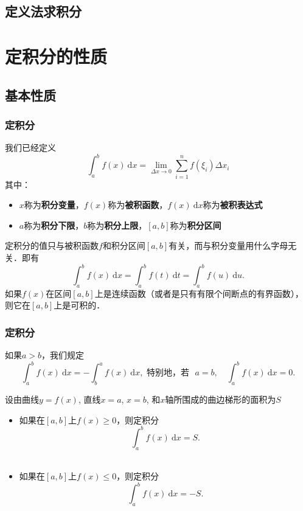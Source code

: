 \documentclass[
10pt,
aspectratio=43,
]{beamer}
\begin{document}
\subsection{定义法求积分}
\section{定积分的性质}
\subsection{基本性质}

\begin{frame}
	\frametitle{定积分}
	我们已经定义
	\[
		\int_a^b f(x)\mathrm{~d}x  = \lim_{\Delta x\to 0} \sum_{i=1}^n f(\xi_i)\Delta x_i
	\]
	其中：
	\begin{itemize}
		\item $x$称为{\bf 积分变量}，$f(x)$称为{\bf 被积函数}，$f(x)\mathrm{~d}x$称为{\bf 被积表达式}
		\item $a$称为{\bf 积分下限}，$b$称为{\bf 积分上限}，$[a,b]$称为{\bf 积分区间}
	\end{itemize}
	\begin{block}{}
		定积分的值只与被积函数$f$和积分区间$[a,b]$有关，而与积分变量用什么字母无关．即有
		\[
			\int_a^b f(x)\mathrm{~d}x = \int_a^b f(t)\mathrm{~d}t = \int_a^b f(u)\mathrm{~d}u.
		\]
		如果$f(x)$在区间$[a,b]$上是连续函数（或者是只有有限个间断点的有界函数），则它在$[a,b]$上是可积的．
	\end{block}
\end{frame}

\begin{frame}
	\frametitle{定积分}
	\begin{block}{}
		如果$a>b$，我们规定
		$$
			\int_a^b f(x)\mathrm{~d} x = -\int_b^a f(x)\mathrm{~d} x,\text{ 特别地，若 }\,\,a=b,\quad \int_a^b f(x)\mathrm{~d} x = 0 .
		$$
	\end{block}
	\begin{block}{}
		设由曲线$y=f(x)$, 直线$x=a$, $x=b$, 和$x$轴所围成的曲边梯形的面积为$S$
		\begin{itemize}
			\item 如果在$[a,b]$上$f(x)\geq 0$，则定积分
			      $$
				      \int_a^b f(x)\mathrm{~d} x=S.
			      $$\
			\item 如果在$[a,b]$上$f(x)\leq 0$，则定积分$$\int_a^b f(x)\mathrm{~d} x=-S.$$
		\end{itemize}
	\end{block}
\end{frame}
\end{document}
